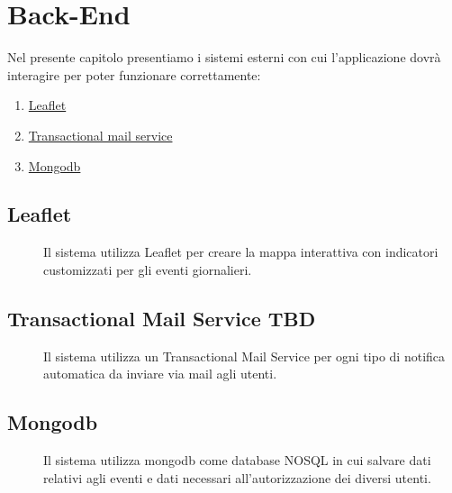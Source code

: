 \documentclass{article}
\begin{document}
\section{Back-End}
Nel presente capitolo presentiamo i sistemi esterni con cui l’applicazione dovrà interagire per poter funzionare correttamente:
\begin{enumerate}
    \item \hyperref[leaflet]{Leaflet}
    \item \hyperref[TMS]{Transactional mail service}
    \item \hyperref[mongo]{Mongodb}
\end{enumerate}
\subsection{Leaflet \label{leaflet}}
\begin{description}
    \item[] Il sistema utilizza Leaflet per creare la mappa interattiva con indicatori customizzati per gli eventi giornalieri.
\end{description}
\subsection{Transactional Mail Service TBD \label{TMS}}
\begin{description}
    \item[] Il sistema utilizza un Transactional Mail Service per ogni tipo di notifica automatica da inviare via mail agli utenti.
\end{description}
\subsection{Mongodb \label{mongo}}
\begin{description}
    \item[] Il sistema utilizza mongodb come database NOSQL in cui salvare dati relativi agli eventi e dati necessari all'autorizzazione dei diversi utenti.
\end{description}
\end{document}
